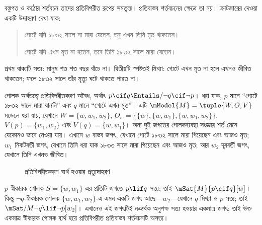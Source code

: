 \documentclass[../../../include/open-logic-section]{subfiles}
\begin{document}


বস্তুগত ও কঠোর শর্তবচন তাদের প্রতিবিপরীত রূপের সমতুল্য।
প্রতিবাস্তব শর্তবচনের ক্ষেত্রে তা নয়। ক্রাটজারের দেওয়া
একটি উদাহরণ দেখা যাক:
\begin{quote}
  গ্যেটে যদি ১৮৩২ সালে না মারা যেতেন, তবু এখন তিনি মৃত থাকতেন।

  গ্যেটে যদি এখন মৃত না হতেন, তবে তিনি ১৮৩২ সালে মারা যেতেন।
\end{quote}
প্রথম বাক্যটি সত্য: মানুষ শত শত বছর বাঁচে না। দ্বিতীয়টি
স্পষ্টতই মিথ্যা: গ্যেটে এখন মৃত না হলে এখনও জীবিত
থাকতেন; ফলে ১৮৩২ সালে তাঁর মৃত্যু ঘটে থাকতে পারত না।

\begin{ex}
  গোলক অর্থতত্ত্বে প্রতিবিপরীতকরণ অবৈধ, অর্থাৎ $p
  \cif q \Entails/ \lnot q \cif \lnot p$। ধরা যাক, $p$ মানে
  ``গ্যেটে ১৮৩২ সালে মারা যাননি'' এবং $q$ মানে ``গ্যেটে এখন মৃত''।
  এটি $\mModel{M} = \tuple{W, O, V}$ মডেলে ধরা যায়, যেখানে
  $W = \{w, w_1, w_2\}$,
  $O_w = \{\{w\}, \{w, w_1\}, \{w, w_1, w_2\}\}$,
  $V(p) = \{w_1, w_2\}$ এবং $V(q) = \{w, w_1\}$। অন্য দুই
  জগতের গোলকব্যবস্থা সংজ্ঞার শর্ত মেনে যেকোনও ভাবে নেওয়া যায়। এখানে
  $w$ বাস্তব জগৎ, যেখানে গ্যেটে ১৮৩২ সালে মারা গিয়েছেন এবং
  আজও মৃত; $w_1$ নিকটবর্তী জগৎ, যেখানে তিনি ধরা যাক
  ১৮৩৩ সালে মারা গিয়েছেন এবং আজও মৃত; আর $w_2$
  দূরবর্তী জগৎ, যেখানে তিনি এখনও জীবিত।
\begin{figure}
\begin{center}
\caption{প্রতিবিপরীতকরণ ব্যর্থ হওয়ার প্রত্যুদাহরণ}
\end{center}
\end{figure}
$p$-স্বীকারক গোলক $S = \{w, w_1\}$-এর প্রতিটি জগতে
$p \lif q$ সত্য; তাই $\mSat{M}{p \cif q}[w]$। কিন্তু
$\lnot q$-স্বীকারক গোলক $\{w, w_1, w_2\}$-এ এমন একটি জগৎ
আছে—$w_2$—যেখানে $q$ মিথ্যা ও $p$ সত্য; তাই
$\mSat/{M}{\lnot q \lif \lnot p}[w_2]$। এখানেও
এই জগৎটিই নঞর্থক অনুপক্ষ সত্য হওয়ার একমাত্র জগৎ; তাই
উক্ত একমাত্র স্বীকারক গোলক ব্যর্থ হয়ে প্রতিবিপরীত প্রতিবাস্তব
শর্তবচনটি অসত্য।
\end{ex}
\end{document}
